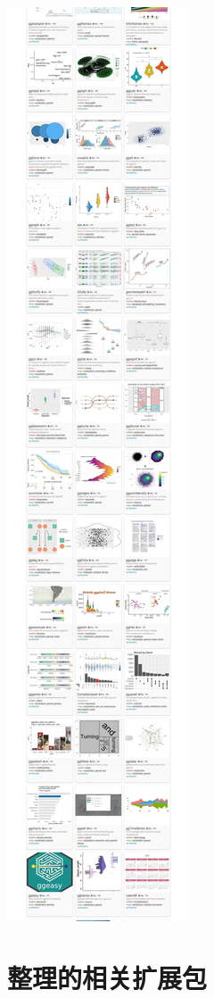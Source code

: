 \documentclass[
]{book}
\begin{document}
\includegraphics{images/38701658555592_.pic.jpg}

\hypertarget{ux6574ux7406ux7684ux76f8ux5173ux6269ux5c55ux5305}{%
\section{整理的相关扩展包}\label{ux6574ux7406ux7684ux76f8ux5173ux6269ux5c55ux5305}}
\end{document}
